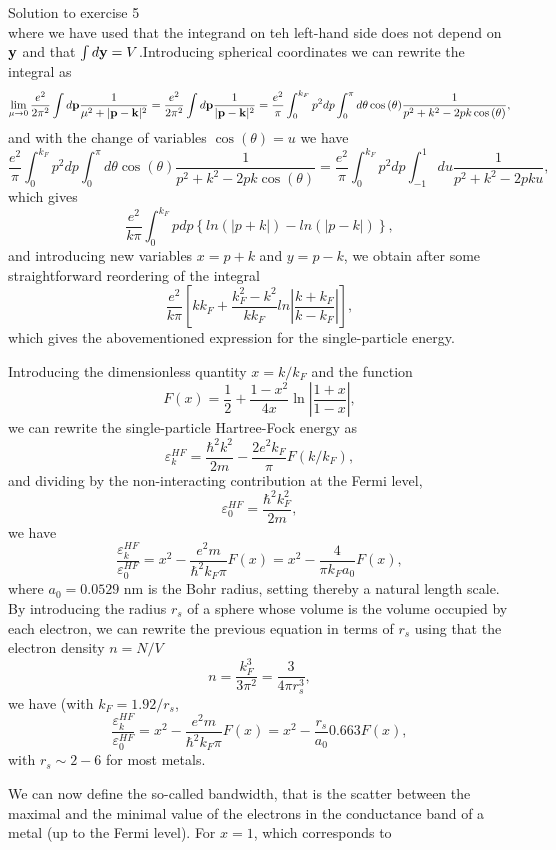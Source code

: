 \documentclass[%
twoside,                 %
final,                   %
10pt]{article}
\begin{document}
\begin{block}{Solution to exercise 5 }
\[\]
where we have used that the integrand on teh left-hand side does not depend on ${\bf y}$ and that $\int d{\bf y}=V$.Introducing spherical coordinates we can rewrite the integral as 
\[
\lim_{\mu \to 0}\frac{e^{2}}{ 2\pi^2}  \int d{\bf p}\frac{1}{\mu^2+\vert {\bf p}-{\bf k}\vert^2}=\frac{e^{2}}{ 2\pi^2}  \int d{\bf p}\frac{1}{\vert {\bf p}-{\bf k}\vert^2}=\frac{e^{2}}{\pi}  \int_0^{k_F} p^2dp\int_0^{\pi} d\theta\cos{(\theta)}\frac{1}{p^2+k^2-2pk\cos{(\theta)}},
\]
and with the change of variables $\cos{(\theta)}=u$ we have 
\[
\frac{e^{2}}{\pi}  \int_0^{k_F} p^2dp\int_{0}^{\pi} d\theta\cos{(\theta)}\frac{1}{p^2+k^2-2pk\cos{(\theta)}}=\frac{e^{2}}{\pi}  \int_0^{k_F} p^2dp\int_{-1}^{1} du\frac{1}{p^2+k^2-2pku},
\]
which gives
\[
\frac{e^{2}}{k\pi}  \int_0^{k_F} pdp\left\{ln(\vert p+k\vert)-ln(\vert p-k\vert)\right\},
\]
and introducing new variables $x=p+k$ and $y=p-k$, we obtain after some straightforward reordering of the integral
\[
\frac{e^{2}}{k\pi}\left[
kk_F+\frac{k_{F}^{2}-k^{2}}{kk_{F}}ln\left\vert\frac{k+k_{F}}
{k-k_{F}}\right\vert
\right],
\]
which gives the abovementioned expression for the single-particle energy.

Introducing the dimensionless quantity $x=k/k_F$ and the function
\[
F(x) = \frac{1}{2}+\frac{1-x^2}{4x}\ln{\left\vert \frac{1+x}{1-x}\right\vert},
\]
we can rewrite the single-particle Hartree-Fock energy as 
\[
\varepsilon_{k}^{HF}=\frac{\hbar^{2}k^{2}}{2m}-\frac{2e^{2}
k_{F}}{\pi}F(k/k_F),
\]
and dividing by the non-interacting contribution at the Fermi level, 
\[
\varepsilon_{0}^{HF}=\frac{\hbar^{2}k_F^{2}}{2m},
\]
we have
\[
\frac{\varepsilon_{k}^{HF} }{\varepsilon_{0}^{HF}}=x^2-\frac{e^2m}{\hbar^2 k_F\pi}F(x)=x^2-\frac{4}{\pi k_Fa_0}F(x),
\]
where $a_0=0.0529$ nm is the Bohr radius, setting thereby a natural length scale. 
By introducing the radius $r_s$ of a sphere whose volume is the volume occupied by each electron, we can rewrite the previous equation in terms of $r_s$ using that the electron density $n=N/V$
\[
n=\frac{k_F^3}{3\pi^2} = \frac{3}{4\pi r_s^3},
\]
we have (with $k_F=1.92/r_s$,
\[
\frac{\varepsilon_{k}^{HF} }{\varepsilon_{0}^{HF}}=x^2-\frac{e^2m}{\hbar^2 k_F\pi}F(x)=x^2-\frac{r_s}{a_0}0.663F(x),
\]
with $r_s \sim 2-6$ for most metals. 

We can now define the so-called bandwidth, that is the scatter between the maximal and the minimal value of the electrons in the conductance band of a metal (up to the Fermi level). For $x=1$, which corresponds to 



\end{block}
\end{document}
